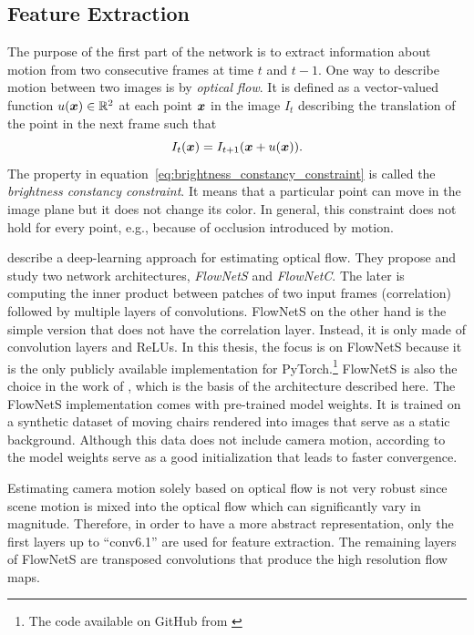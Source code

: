 		\subsection{Feature Extraction}
			The purpose of the first part of the network is to extract information about motion from two consecutive frames at time $t$ and $t - 1$.
			One way to describe motion between two images is by \emph{optical flow}.
			It is defined as a vector-valued function $u(\bm{x}) \in \mathbb{R}^2$ at each point $\bm{x}$ in the image $I_{t}$ describing the translation of the point in the next frame such that
			\begin{equation}\label{eq:brightness_constancy_constraint}
				I_{t}(\bm{x}) = I_{t + 1}(\bm{x} + u(\bm{x})).
			\end{equation}
			The property in equation~\ref{eq:brightness_constancy_constraint} is called the \emph{brightness constancy constraint}. 
			It means that a particular point can move in the image plane but it does not change its color.
			In general, this constraint does not hold for every point, e.g., because of occlusion introduced by motion.
			
			\cite{dosovitskiy2015flownet} describe a deep-learning approach for estimating optical flow.
			They propose and study two network architectures, \emph{FlowNetS} and \emph{FlowNetC}.
			The later is computing the inner product between patches of two input frames (correlation) followed by multiple layers of convolutions.
			FlowNetS on the other hand is the simple version that does not have the correlation layer. 
			Instead, it is only made of convolution layers and ReLUs.
			In this thesis, the focus is on FlowNetS because it is the only publicly available implementation for PyTorch.\footnote{The code available on GitHub from \citet*{flownetpytorch}}
			FlowNetS is also the choice in the work of \citeauthor{wang2017deepvo}, which is the basis of the architecture described here.
			The FlowNetS implementation comes with pre-trained model weights.
			It is trained on a synthetic dataset of moving chairs rendered into images that serve as a static background.
			Although this data does not include camera motion, according to \citeauthor{wang2017deepvo} the model weights serve as a good initialization that leads to faster convergence. 
			
			Estimating camera motion solely based on optical flow is not very robust since scene motion is mixed into the optical flow which can significantly vary in magnitude.
			Therefore, in order to have a more abstract representation, only the first layers up to ``conv6.1'' are used for feature extraction.
			The remaining layers of FlowNetS are transposed convolutions that produce the high resolution flow maps.
			
